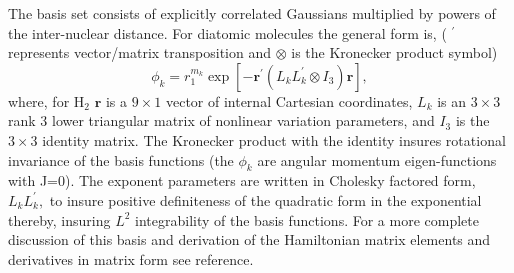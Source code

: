 The basis set consists of explicitly correlated Gaussians multiplied
by powers of the inter-nuclear distance.  For diatomic molecules the
general form is, ( $^{\prime }$ represents vector/matrix transposition
and $\otimes $ is the Kronecker product symbol)
\begin{equation} \label{basis}
 \phi _k =
  r_{1}^{m_k} \exp \left[ -\mathbf{r}^{\prime }
      \left( L_kL_k^{\prime }\otimes I_3\right)\mathbf{r}\right],
\end{equation}
where, for H$_2$ $ \mathbf{r}$ is a $9\times 1$ vector of internal
Cartesian coordinates, $L_k$ is an $3\times 3$ rank $3$ lower
triangular matrix of nonlinear variation parameters, and $I_3$ is the
$3\times 3$ identity matrix. The Kronecker product with the identity
insures rotational invariance of the basis functions (the $\phi _k$
are angular momentum eigen-functions with J=0). The exponent
parameters are written in Cholesky factored form, $L_kL_k^{\prime },$
to insure positive definiteness of the quadratic form in the
exponential thereby, insuring $L^2$ integrability of the basis
functions.  For a more complete discussion of this basis and
derivation of the Hamiltonian matrix elements and derivatives in
matrix form see reference\cite{Kinghorn99a}.

